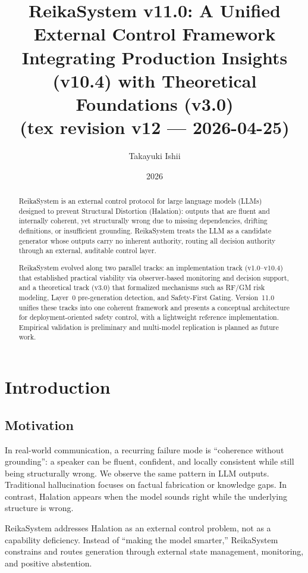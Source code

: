 \documentclass[11pt,a4paper]{article}
\title{ReikaSystem v11.0: A Unified External Control Framework\\
\large Integrating Production Insights (v10.4) with Theoretical Foundations (v3.0)
\\ \small (tex revision v12 --- 2026-04-25)}
\author{Takayuki Ishii}
\date{2026}
\begin{document}
\maketitle

\begin{abstract}
ReikaSystem is an external control protocol for large language models (LLMs) designed to
prevent Structural Distortion (Halation): outputs that are fluent and internally coherent, yet
structurally wrong due to missing dependencies, drifting definitions, or insufficient grounding.
ReikaSystem treats the LLM as a candidate generator whose outputs carry no inherent authority,
routing all decision authority through an external, auditable control layer.

ReikaSystem evolved along two parallel tracks: an implementation track (v1.0--v10.4)
that established practical viability via observer-based monitoring and decision support, and
a theoretical track (v3.0) that formalized mechanisms such as RF/GM risk modeling, Layer~0
pre-generation detection, and Safety-First Gating. Version~11.0 unifies these tracks into one
coherent framework and presents a conceptual architecture for
deployment-oriented safety control, with a lightweight reference implementation. Empirical validation is preliminary and
multi-model replication is planned as future work.
\end{abstract}

\section{Introduction}

\subsection{Motivation}
In real-world communication, a recurring failure mode is ``coherence without grounding'': a
speaker can be fluent, confident, and locally consistent while still being structurally wrong.
We observe the same pattern in LLM outputs. Traditional hallucination focuses on factual
fabrication or knowledge gaps. In contrast, Halation appears when the model sounds right while
the underlying structure is wrong.

ReikaSystem addresses Halation as an external control problem, not as a capability deficiency.
Instead of ``making the model smarter,'' ReikaSystem constrains and routes generation through
external state management, monitoring, and positive abstention.
\end{document}
